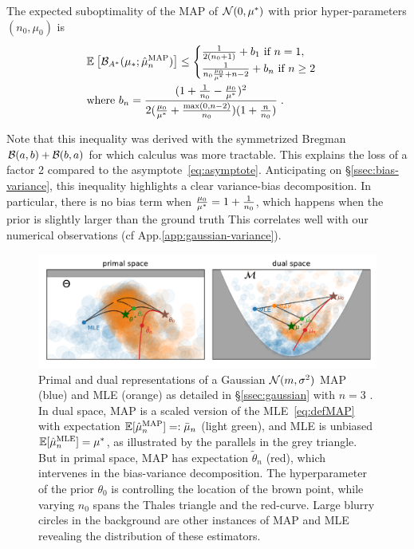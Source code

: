 \documentclass[twoside]{article}
\newcommand*{\expect}[2][]{\ensuremath{\mathbb{E}_{#1} \left[ #2 \right] }} %
\newcommand{\logpart}{A}
\newcommand{\bregmanconj}{\cB_{\logpart^*}}
\newcommand{\nat}{\theta}
\newcommand{\m}{\mu}
\begin{document}
\begin{theorem}
\label{thm:varianceMAP}
The expected suboptimality of the MAP of $\cN(0,\m^*)$ with prior hyper-parameters $(n_0,\m_0)$ is
 \begin{align}
	& \expect{\bregmanconj( \m_*; \hat \m_n^\mathrm{MAP})}
	\leq \begin{cases}
		\inv{2(n_0+1)}  +  b_1 \ \text{if}\ n=1,\\
		\frac{1}{n_0 \frac{\m_0}{\m^*} +n-2} + b_n \ \text{if}\ n\geq 2
	\end{cases}
	\label{eq:MAP_rate}\\
	& \text{where }b_n = \frac{(1 + \inv{n_0} - \frac{\m_0}{\m^*})^2}{2 (\frac{\m_0}{\m^*}+\frac{\max(0,n-2)}{n_0})(1 + \frac{n}{n_0} )} \; . \nonumber
\end{align}
\end{theorem}
Note that this inequality was derived with the symmetrized Bregman ${\mathcal B}(a,b) + {\mathcal B}(b,a)$ for which calculus was more tractable.
This explains the loss of a factor 2 compared to the asymptote~\eqref{eq:asymptote}.
Anticipating on \S\ref{ssec:bias-variance}, this inequality highlights a clear variance-bias decomposition.
In particular, there is no bias term when $\frac{\m_0}{\m^*} =1 + \inv{n_0} $, which happens when the prior is slightly larger than the ground truth
This correlates well with our numerical observations (cf App.\ref{app:gaussian-variance}).

\begin{figure}[t]
	\centering
	\includegraphics[width=.8\textwidth]{figs/thales/numerical_schema_n=3.pdf}
	\caption{
	Primal and dual representations of a Gaussian ${\mathcal N}(m,\sigma^2)$ MAP (blue) and MLE (orange) as detailed in \S\ref{ssec:gaussian} with $n=3$ . 
	In dual space, MAP is a scaled version of the MLE~\eqref{eq:defMAP} with expectation $\E[\hat\m_n^\text{MAP}]=:\bar \m_n$ (light green), and MLE is unbiased $\E[\hat\m_n^\text{MLE}]=\m^*$, as illustrated by the parallels in the grey triangle.
	But in primal space, MAP has expectation $\tilde \nat_n$ (red), which intervenes in the bias-variance decomposition.
	The hyperparameter of the prior $\nat_0$ is controlling the location of the brown point, while varying $n_0$ spans the Thales triangle and the red-curve.
	Large blurry circles in the background are other instances of MAP and MLE revealing the distribution of these estimators.
	}
	\label{fig:thales}
\end{figure}
\end{document}
